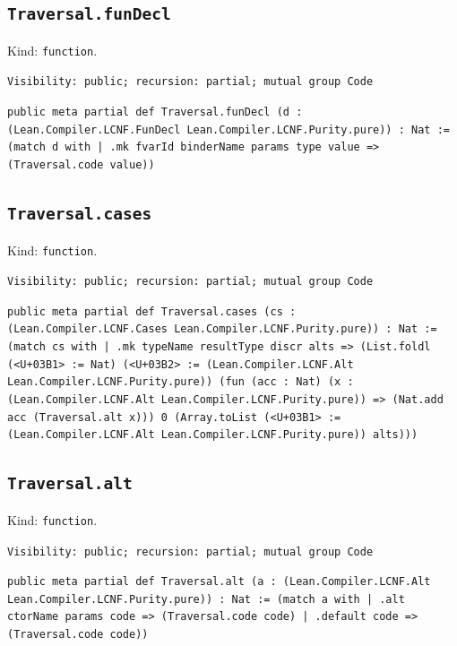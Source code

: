 \documentclass[11pt]{article}
\begin{document}
\subsection*{\texttt{Traversal.funDecl}}
\noindent Kind: \texttt{function}.\par
\noindent \texttt{Visibility: public; recursion: partial; mutual group Code}\par
\noindent \texttt{public meta partial def Traversal.funDecl (d : (Lean.Compiler.LCNF.FunDecl Lean.Compiler.LCNF.Purity.pure)) : Nat :=   (match d with | .mk fvarId binderName params type value => (Traversal.code value))}\par
\subsection*{\texttt{Traversal.cases}}
\noindent Kind: \texttt{function}.\par
\noindent \texttt{Visibility: public; recursion: partial; mutual group Code}\par
\noindent \texttt{public meta partial def Traversal.cases (cs : (Lean.Compiler.LCNF.Cases Lean.Compiler.LCNF.Purity.pure)) : Nat :=   (match cs with | .mk typeName resultType discr alts => (List.foldl (<U+03B1> := Nat) (<U+03B2> := (Lean.Compiler.LCNF.Alt Lean.Compiler.LCNF.Purity.pure)) (fun (acc : Nat) (x : (Lean.Compiler.LCNF.Alt Lean.Compiler.LCNF.Purity.pure)) => (Nat.add acc (Traversal.alt x))) 0 (Array.toList (<U+03B1> := (Lean.Compiler.LCNF.Alt Lean.Compiler.LCNF.Purity.pure)) alts)))}\par
\subsection*{\texttt{Traversal.alt}}
\noindent Kind: \texttt{function}.\par
\noindent \texttt{Visibility: public; recursion: partial; mutual group Code}\par
\noindent \texttt{public meta partial def Traversal.alt (a : (Lean.Compiler.LCNF.Alt Lean.Compiler.LCNF.Purity.pure)) : Nat :=   (match a with | .alt ctorName params code => (Traversal.code code) | .default code => (Traversal.code code))}\par
\end{document}

